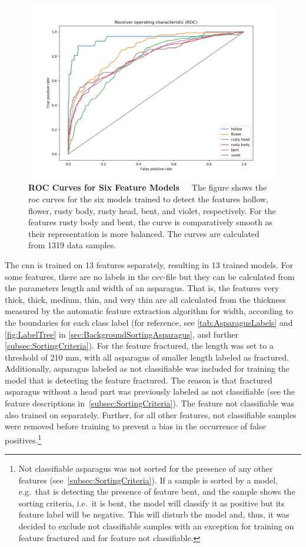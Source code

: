 \begin{figure}[!htb]
	\centering
	\includegraphics[scale=0.6]{Figures/chapter04/singellabelROC.png}
	\decoRule
	\caption[Single-Label CNN ROC Curve]{\textbf{ROC Curves for Six Feature Models}~~~The figure shows the \acrshort{roc} curves for the six models trained to detect the features hollow, flower, rusty body, rusty head, bent, and violet, respectively. For the features rusty body and bent, the curve is comparatively smooth as their representation is more balanced. The curves are calculated from 1319 data samples.}
	\label{fig:SingleLabelROC}
\end{figure}

The \acrshort{cnn} is trained on 13 features separately, resulting in 13 trained models. For some features, there are no labels in the csv-file but they can be calculated from the parameters length and width of an asparagus. That is, the features very thick, thick, medium, thin, and very thin are all calculated from the thickness measured by the automatic feature extraction algorithm for width, according to the boundaries for each class label (for reference, see \autoref{tab:AsparagusLabels} and \autoref{fig:LabelTree} in \autoref{sec:BackgroundSortingAsparagus}, and further \autoref{subsec:SortingCriteria}). For the feature fractured, the length was set to a threshold of 210 mm, with all asparagus of smaller length labeled as fractured. Additionally, asparagus labeled as not classifiable was included for training the model that is detecting the feature fractured. The reason is that fractured asparagus without a head part was previously labeled as not classifiable (see the feature descriptions in~\autoref{subsec:SortingCriteria}). The feature not classifiable was also trained on separately. Further, for all other features, not classifiable samples were removed before training to prevent a bias in the occurrence of false positives.\footnote{Not classifiable asparagus was not sorted for the presence of any other features (see~\autoref{subsec:SortingCriteria}). If a sample is sorted by a model, e.g.\ that is detecting the presence of feature bent, and the sample shows the sorting criteria, i.e.\ it is bent, the model will classify it as positive but its feature label will be negative. This will disturb the model and, thus, it was decided to exclude not classifiable samples with an exception for training on feature fractured and for feature not classifiable.}

